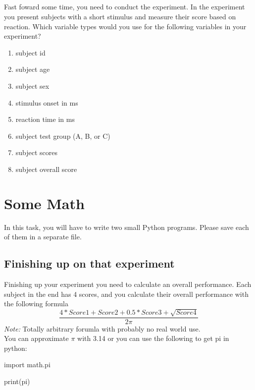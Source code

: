 \subsection{}
Fast foward some time, you need to conduct the experiment. In the experiment you
present subjects with a short stimulus and measure their score based on reaction.
Which variable types would you use for the following variables in your experiment?
\begin{enumerate}
	\item subject id
	\item subject age
	\item subject sex
	\item stimulus onset in ms
	\item reaction time in ms
	\item subject test group (A, B, or C)
	\item subject scores
	\item subject overall score
\end{enumerate}

\section{Some Math}
In this task, you will have to write two small Python programs. Please save each
of them in a separate file.

\subsection{Finishing up on that experiment}
Finishing up your experiment you need to calculate an overall performance.
Each subject in the end has 4 scores, and you calculate their overall performance
with the following formula $$ \dfrac{4*Score1 + Score2 + 0.5*Score3 + \sqrt{Score4}}{2\pi} $$
\emph{Note:} Totally arbitrary forumla with probably no real world use.\\
You can approximate \(\pi \) with 3.14 or you can use the following to get pi in python:
\begin{python}
import math.pi


print(pi)
\end{python}

